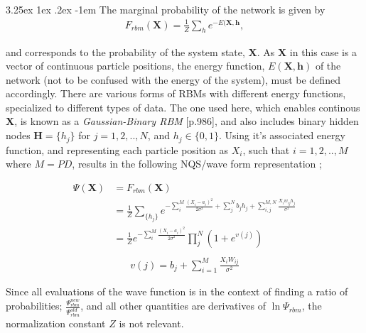 \documentclass[%
oneside,                 %
final,                   %
10pt]{article}
\makeatletter
\renewcommand\paragraph{\@startsection{paragraph}{5}{\z@}%
  {3.25ex \@plus1ex \@minus.2ex}%
  {-1em}%
  {\normalfont\normalsize\bfseries}}
\makeatother
\begin{document}
\paragraph{The marginal probability of the network} is given by
\begin{equation*}
\begin{aligned}
F_{rbm}(\bm X) = \frac{1}{Z} \sum_h e^{-E(\bm X, \bm h} ,
\end{aligned}
\label{eq:TWF}
\end{equation*}



and corresponds to the probability of the system state, $\bm X$. As $\bm X$ in this case is a vector of continuous particle positions, the energy function, $E(\bm X, \bm h)$ of the network (not to be confused with the energy of the system), must be defined accordingly. There are various forms of RBMs with different energy functions, specialized to different types of data. The one used here, which enables continous $\bm X$, is known as a \textit{Gaussian-Binary RBM} \cite{MLMurphy}[p.986], and also includes binary hidden nodes $\bm H=\{h_j\}$ for $j=1,2,..,N$, and $h_j \in \{0,1\}$. Using it's associated energy function, and representing each particle position as $X_i$, such that $i=1,2,..,M$ where $M=PD$, results in the following NQS/wave form representation \cite{MLoppgave}; 

\begin{equation}
\begin{aligned}
\Psi (\mathbf{X}) &= F_{rbm}(\mathbf{X}) \\
&= \frac{1}{Z} \sum_{\{h_j\}} e^{-\sum_i^M \frac{(X_i - a_i)^2}{2\sigma^2} + \sum_j^N b_j h_j + \sum_{i,j}^{M,N} \frac{X_i w_{ij} h_j}{\sigma^2}} \\
&= \frac{1}{Z} e^{-\sum_i^M \frac{(X_i - a_i)^2}{2\sigma^2}} \prod_j^N (1 + e^{ v(j)}) \\
\end{aligned}
\end{equation}
\begin{equation}
\begin{aligned}
v(j) = b_j + \sum_{i=1}^M \frac{X_i W_{ij} }{\sigma^2}
\end{aligned}
\label{eq:v_j}
\end{equation}

Since all evaluations of the wave function is in the context of finding a ratio of probabilities; $\frac{\Psi_{rbm}^{new}}{\Psi_{rbm}^{old}}$, and all other quantities are derivatives of $\ln \Psi_{rbm}$, the normalization constant $Z$ is not relevant.
\end{document}
